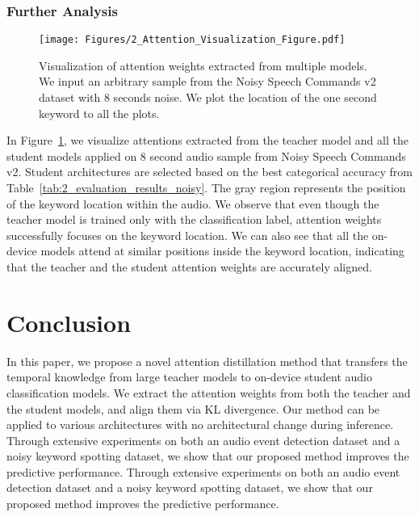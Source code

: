 \documentclass{article}
\begin{document}
\subsubsection{Further Analysis}\label{subsubsec:3_2_3_further_analyses}
\begin{figure}[t] \centering
\texttt{[image: Figures/2\_Attention\_Visualization\_Figure.pdf]}
\vspace{-1em}
\caption{
Visualization of attention weights extracted from multiple models.
We input an arbitrary sample from the Noisy Speech Commands v2 dataset with 8 seconds noise.
We plot the location of the one second keyword to all the plots.
}
\label{fig:2_attention_visualization}
\end{figure} In Figure~\ref{fig:2_attention_visualization}, we visualize attentions extracted from the teacher model and all the student models applied on 8 second audio sample from Noisy Speech Commands v2.
Student architectures are selected based on the best categorical accuracy from Table~\ref{tab:2_evaluation_results_noisy}.
The gray region represents the position of the keyword location within the audio.
We observe that even though the teacher model is trained only with the classification label, attention weights successfully focuses on the keyword location.
We can also see that all the on-device models attend at similar positions inside the keyword location, indicating that the teacher and the student attention weights are accurately aligned. \section{Conclusion}\label{sec:4_conclusion}
In this paper, we propose a novel attention distillation method that transfers the temporal knowledge from large teacher models to on-device student audio classification models.
We extract the attention weights from both the teacher and the student models, and align them via KL divergence.
Our method can be applied to various architectures with no architectural change during inference.
Through extensive experiments on both an audio event detection dataset and a noisy keyword spotting dataset, we show that our proposed method improves the predictive performance.
Through extensive experiments on both an audio event detection dataset and a noisy keyword spotting dataset, we show that our proposed method improves the predictive performance.
 



\end{document}

